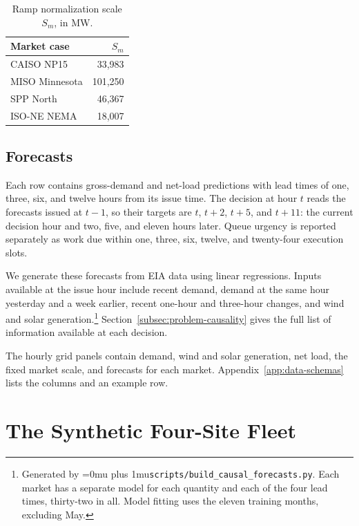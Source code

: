 \documentclass[conference]{IEEEtran}
\newcommand{\codepath}[1]{{\Urlmuskip=0mu plus 1mu\relax\nolinkurl{#1}}}
\begin{document}
\begin{table}[htbp]
  \centering
  \footnotesize
  \caption{Ramp normalization scale \(S_m\), in MW.}
  \label{tab:frozen-stats}
  \begin{tabular}{@{}lr@{}}
    \toprule
    Market case & \(S_m\) \\
    \midrule
    CAISO NP15     & 33,983 \\
    MISO Minnesota & 101,250 \\
    SPP North      & 46,367 \\
    ISO-NE NEMA    & 18,007 \\
    \bottomrule
  \end{tabular}
\end{table}

\subsection{Forecasts}
\label{subsec:energy-forecasts}

Each row contains gross-demand and net-load predictions with lead times of
one, three, six, and twelve hours from its issue time. The decision at hour
\(t\) reads the forecasts issued at \(t-1\), so their targets are
\(t\), \(t+2\), \(t+5\), and \(t+11\): the current decision hour and
two, five, and eleven hours later. Queue urgency is reported separately as
work due within one, three, six, twelve, and twenty-four execution slots.

We generate these forecasts from EIA data using linear regressions. Inputs
available at the issue hour include recent demand, demand at the same hour
yesterday and a week earlier, recent one-hour and three-hour changes, and
wind and solar generation.\footnote{Generated
by \codepath{scripts/build_causal_forecasts.py}. Each market has a separate
model for each quantity and each of the four lead times, thirty-two in all.
Model fitting uses the eleven training months, excluding May.}
Section~\ref{subsec:problem-causality} gives the full list of information
available at each decision.


The hourly grid panels contain demand, wind and solar generation, net load,
the fixed market scale, and forecasts for each market.
Appendix~\ref{app:data-schemas} lists the columns and an example row.

\section{The Synthetic Four-Site Fleet}
\label{sec:data-transformations}
\end{document}
